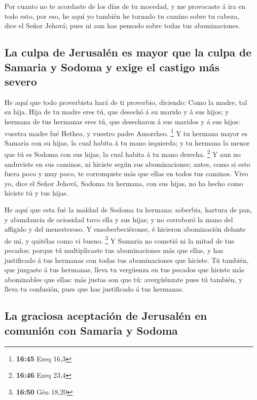  Por cuanto no te acordaste de los días de tu mocedad, y me
provocaste á ira en todo esto, por eso, he aquí yo también he tornado tu
camino sobre tu cabeza, dice el Señor Jehová; pues ni aun has pensado
sobre todas tus abominaciones.

\hypertarget{la-culpa-de-jerusaluxe9n-es-mayor-que-la-culpa-de-samaria-y-sodoma-y-exige-el-castigo-muxe1s-severo}{%
\subsection{La culpa de Jerusalén es mayor que la culpa de Samaria y
Sodoma y exige el castigo más
severo}\label{la-culpa-de-jerusaluxe9n-es-mayor-que-la-culpa-de-samaria-y-sodoma-y-exige-el-castigo-muxe1s-severo}}

 He aquí que todo proverbista hará de ti proverbio,
diciendo: Como la madre, tal su hija.  Hija de tu madre
eres tú, que desechó á su marido y á sus hijos; y hermana de tus
hermanas eres tú, que desecharon á sus maridos y á sus hijos: vuestra
madre fué Hethea, y vuestro padre Amorrheo. \footnote{\textbf{16:45}
  Ezeq 16,3}  Y tu hermana mayor es Samaria con su hijas,
la cual habita á tu mano izquierda; y tu hermana la menor que tú es
Sodoma con sus hijas, la cual habita á tu mano derecha. \footnote{\textbf{16:46}
  Ezeq 23,4}  Y aun no anduviste en sus caminos, ni hiciste
según sus abominaciones; antes, como si esto fuera poco y muy poco, te
corrompiste más que ellas en todos tus caminos.  Vivo yo,
dice el Señor Jehová, Sodoma tu hermana, con sus hijas, no ha hecho como
hiciste tú y tus hijas.

 He aquí que esta fué la maldad de Sodoma tu hermana:
soberbia, hartura de pan, y abundancia de ociosidad tuvo ella y sus
hijas; y no corroboró la mano del afligido y del menesteroso.
 Y ensoberbeciéronse, é hicieron abominación delante de mí,
y quitélas como vi bueno. \footnote{\textbf{16:50} Gén 18,20}
 Y Samaria no cometió ni la mitad de tus pecados; porque tú
multiplicaste tus abominaciones más que ellas, y has justificado á tus
hermanas con todas tus abominaciones que hiciste.  Tú
también, que juzgaste á tus hermanas, lleva tu vergüenza en tus pecados
que hiciste más abominables que ellas: más justas son que tú:
avergüénzate pues tú también, y lleva tu confusión, pues que has
justificado á tus hermanas.

\hypertarget{la-graciosa-aceptaciuxf3n-de-jerusaluxe9n-en-comuniuxf3n-con-samaria-y-sodoma}{%
\subsection{La graciosa aceptación de Jerusalén en comunión con Samaria
y
Sodoma}\label{la-graciosa-aceptaciuxf3n-de-jerusaluxe9n-en-comuniuxf3n-con-samaria-y-sodoma}}

